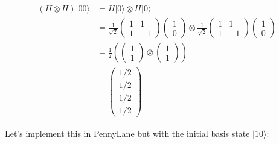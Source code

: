 \documentclass[11pt]{article}
\begin{document}
    \begin{align}
(H \otimes H)|00\rangle &= H|0\rangle \otimes H|0 \rangle \\
&= \frac{1}{\sqrt{2}}
\begin{pmatrix}
1 & 1 \\
1 & -1
\end{pmatrix} \begin{pmatrix} 1\\0 \end{pmatrix} \otimes 
\frac{1}{\sqrt{2}}
\begin{pmatrix}
1 & 1 \\
1 & -1
\end{pmatrix} \begin{pmatrix} 1\\0 \end{pmatrix} \\
&= \frac{1}{2}\left(
\begin{pmatrix} 1\\1 \end{pmatrix} \otimes
\begin{pmatrix} 1\\1 \end{pmatrix}
\right) \\
&= \begin{pmatrix} 1/2 \\ 1/2 \\ 1/2 \\ 1/2 \end{pmatrix}
\end{align}

    Let's implement this in PennyLane but with the initial basis state
\(|10\rangle\):
\end{document}
